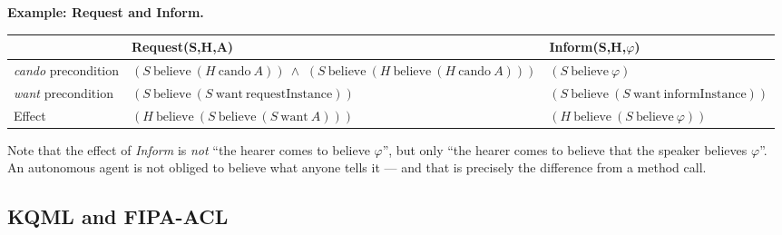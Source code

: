 \documentclass[11pt,a4paper]{article}
\theoremstyle{definition}
\providecommand{\uv}[1]{``#1''}
\begin{document}
\noindent\textbf{Example: Request and Inform.}
\begin{center}\small
\begin{tabular}{p{} p{} p{}}
\toprule
& \textbf{Request(S,H,A)} & \textbf{Inform(S,H,$\varphi$)} \\
\midrule
\emph{cando} precondition
  & $(S\ \mathrm{believe}\ (H\ \mathrm{cando}\ A))\ \wedge$ \newline
    $(S\ \mathrm{believe}\ (H\ \mathrm{believe}\ (H\ \mathrm{cando}\ A)))$
  & $(S\ \mathrm{believe}\ \varphi)$ \\
\emph{want} precondition
  & $(S\ \mathrm{believe}\ (S\ \mathrm{want}\ \mathrm{requestInstance}))$
  & $(S\ \mathrm{believe}\ (S\ \mathrm{want}\ \mathrm{informInstance}))$ \\
Effect
  & $(H\ \mathrm{believe}\ (S\ \mathrm{believe}\ (S\ \mathrm{want}\ A)))$
  & $(H\ \mathrm{believe}\ (S\ \mathrm{believe}\ \varphi))$ \\
\bottomrule
\end{tabular}
\end{center}
Note that the effect of \emph{Inform} is \emph{not} \uv{the hearer comes to believe $\varphi$}, but
only \uv{the hearer comes to believe that the speaker believes $\varphi$}. An autonomous agent is not
obliged to believe what anyone tells it --- and that is precisely the difference from a method call.

\subsection{KQML and FIPA-ACL}
\end{document}
